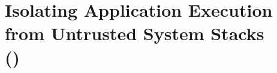 
\chapter{Isolating Application Execution from Untrusted System Stacks \\ ({\em \sysname{}})}











